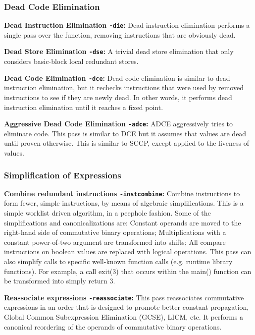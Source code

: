 \subsubsection{Dead Code Elimination}

\noindent\textbf{Dead Instruction Elimination \texttt{-die}:}
Dead instruction elimination performs a single pass over the function, removing instructions that are obviously dead.

\noindent\textbf{Dead Store Elimination \texttt{-dse}:}
A trivial dead store elimination that only considers basic-block local redundant stores.

\noindent\textbf{Dead Code Elimination \texttt{-dce}:}
Dead code elimination is similar to dead instruction elimination, but it rechecks instructions that were used by removed instructions to see if they are newly dead.
In other words, it performs dead instruction elimination until it reaches a fixed point.

\noindent\textbf{Aggressive Dead Code Elimination \texttt{-adce}:}
ADCE aggressively tries to eliminate code.
This pass is similar to DCE but it assumes that values are dead until proven otherwise.
This is similar to SCCP, except applied to the liveness of values.

\subsubsection{Simplification of Expressions}

\noindent\textbf{Combine redundant instructions \texttt{-instcombine}:}
Combine instructions to form fewer, simple instructions, by means of algebraic simplifications.
This is a simple worklist driven algorithm, in a peephole fashion.
Some of the simplifications and canonicalizations are:
Constant operands are moved to the right-hand side of commutative binary operations;
Multiplications with a constant power-of-two argument are transformed into shifts;
All compare instructions on boolean values are replaced with logical operations.
This pass can also simplify calls to specific well-known function calls (e.g. runtime library functions).
For example, a call exit(3) that occurs within the main() function can be transformed into simply return 3.

\noindent\textbf{Reassociate expressions \texttt{-reassociate}:}
This pass reassociates commutative expressions in an order that is designed to promote better constant propagation, Global Common Subexpression Elimination (GCSE), LICM, etc.
It performs a canonical reordering of the operands of commutative binary operations.

